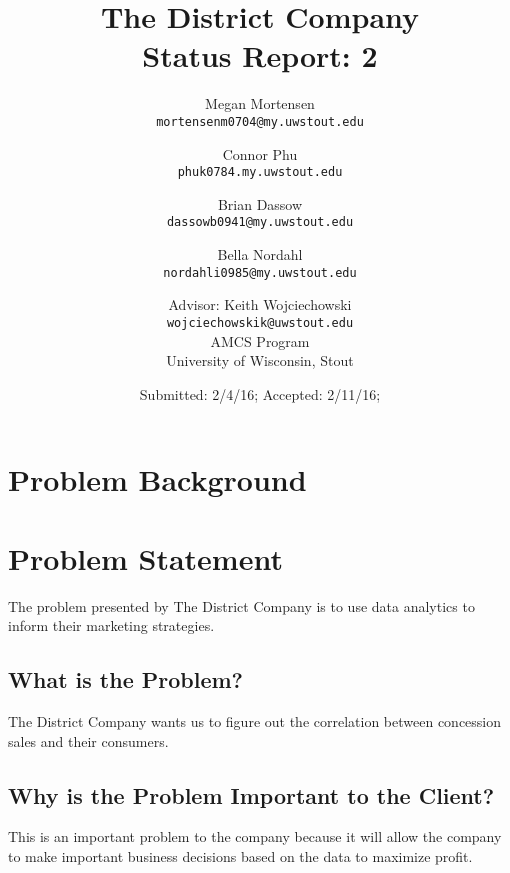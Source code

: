 \documentclass[11pt]{report}
\title{The District Company \\ Status Report: 2}
\author{
Megan Mortensen\\
\small \texttt{mortensenm0704@my.uwstout.edu}
\and
Connor Phu\\
\small \texttt{phuk0784.my.uwstout.edu}
\and
Brian Dassow\\
\small \texttt{dassowb0941@my.uwstout.edu}
\and
Bella Nordahl\\
\small \texttt{nordahli0985@my.uwstout.edu}
\and
Advisor: Keith Wojciechowski\\
\small \texttt{wojciechowskik@uwstout.edu}\\
\bigskip
AMCS Program\\
University of Wisconsin, Stout
}
\date{\small Submitted: 2/4/16;  Accepted: 2/11/16;}
\begin{document}
\maketitle

\section*{\hspace{-.5cm} Problem Background}

\section*{\hspace{-.5cm} Problem Statement}\label{intro}
The problem presented by The District Company is to use data analytics to inform
their marketing strategies.

\subsection*{\hspace{-.5cm} What is the Problem?}\label{tech}
The District Company wants us to figure out the correlation between concession sales and their consumers.

\subsection*{\hspace{-.5cm} Why is the Problem Important to the
Client?}\label{tech} This is an important problem to the company because it will allow the company to make important business decisions based on the data to maximize profit.
\end{document}

